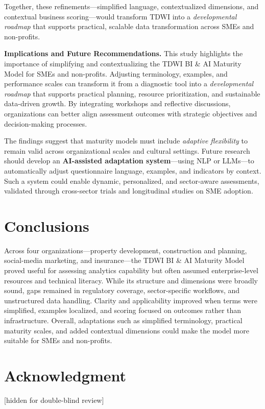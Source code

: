 \documentclass[conference]{IEEEtran}
\begin{document}
Together, these refinements---simplified language, contextualized dimensions, and contextual business scoring---would transform TDWI into a \textit{developmental roadmap} that supports practical, scalable data transformation across SMEs and non-profits.

\textbf{Implications and Future Recommendations. }This study highlights the importance of simplifying and contextualizing the TDWI BI \& AI Maturity Model for SMEs and non-profits.  
Adjusting terminology, examples, and performance scales can transform it from a diagnostic tool into a \textit{developmental roadmap} that supports practical planning, resource prioritization, and sustainable data-driven growth.  
By integrating workshops and reflective discussions, organizations can better align assessment outcomes with strategic objectives and decision-making processes.

The findings suggest that maturity models must include \textit{adaptive flexibility} to remain valid across organizational scales and cultural settings.  
Future research should develop an \textbf{AI-assisted adaptation system}---using NLP or LLMs---to automatically adjust questionnaire language, examples, and indicators by context.  
Such a system could enable dynamic, personalized, and sector-aware assessments, validated through cross-sector trials and longitudinal studies on SME adoption.



\section{Conclusions}
\label{sec:conclusions}

Across four organizations---property development, construction and planning, social-media marketing, and insurance---the TDWI BI \& AI Maturity Model proved useful for assessing analytics capability but often assumed enterprise-level resources and technical literacy. While its structure and dimensions were broadly sound, gaps remained in regulatory coverage, sector-specific workflows, and unstructured data handling. Clarity and applicability improved when terms were simplified, examples localized, and scoring focused on outcomes rather than infrastructure. Overall, adaptations such as simplified terminology, practical maturity scales, and added contextual dimensions could make the model more suitable for SMEs and non-profits.


\section*{Acknowledgment}
[hidden for double-blind review]




\end{document}
